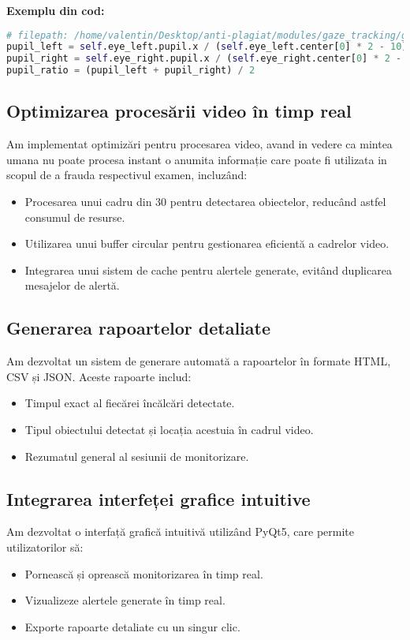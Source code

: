 \documentclass[12pt,a4paper]{article}
\begin{document}
\textbf{Exemplu din cod:}
\begin{lstlisting}[language=Python]
# filepath: /home/valentin/Desktop/anti-plagiat/modules/gaze_tracking/gaze_tracker.py
pupil_left = self.eye_left.pupil.x / (self.eye_left.center[0] * 2 - 10)
pupil_right = self.eye_right.pupil.x / (self.eye_right.center[0] * 2 - 10)
pupil_ratio = (pupil_left + pupil_right) / 2
\end{lstlisting}

\subsection{Optimizarea procesării video în timp real}
Am implementat optimizări pentru procesarea video, avand in vedere ca mintea umana nu poate procesa instant o anumita informație care poate fi utilizata in scopul de a frauda respectivul examen, incluzând:
\begin{itemize}
    \item Procesarea unui cadru din 30 pentru detectarea obiectelor, reducând astfel consumul de resurse.
    \item Utilizarea unui buffer circular pentru gestionarea eficientă a cadrelor video.
    \item Integrarea unui sistem de cache pentru alertele generate, evitând duplicarea mesajelor de alertă.
\end{itemize}

\subsection{Generarea rapoartelor detaliate}
Am dezvoltat un sistem de generare automată a rapoartelor în formate HTML, CSV și JSON. Aceste rapoarte includ:
\begin{itemize}
    \item Timpul exact al fiecărei încălcări detectate.
    \item Tipul obiectului detectat și locația acestuia în cadrul video.
    \item Rezumatul general al sesiunii de monitorizare.
\end{itemize}

\subsection{Integrarea interfeței grafice intuitive}
Am dezvoltat o interfață grafică intuitivă utilizând PyQt5, care permite utilizatorilor să:
\begin{itemize}
    \item Pornească și oprească monitorizarea în timp real.
    \item Vizualizeze alertele generate în timp real.
    \item Exporte rapoarte detaliate cu un singur clic.
\end{itemize}
\end{document}
